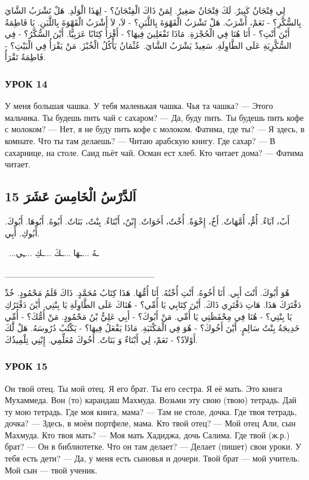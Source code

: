 \documentclass[a5paper]{article}
\begin{document}
لِي فِنْجَانٌ كَبِيرٌ. لَكَ فِنْجَانٌ صَغِيرٌ. لِمَنْ ذَاكَ الْفِنْجَانُ؟ - لِهَذَا الْوَلَدِ. هَلْ تَشْرَبُ الشَّايَ بِالسُّكَّرِ؟ - نَعَمْ، أَشْرَبُ. هَلْ تَشْرَبُ الْقَهْوَةَ بِاللَّبَنِ؟ - لاَ، لاَ أَشْرَبُ الْقَهْوَةَ بِاللَّبَنِ. يَا فَاطِمَةُ أَيْنَ أَنْتِ؟ - أَنَا هُنَا فِي الْحُجْرَةِ. مَاذَا تَفْعَلِينَ فِيهَا؟ - أَقْرَأُ كِتَابًا عَرَبِيًّا. أَيْنَ السُّكَّرُ؟ - فِي السُّكَّرِيَةِ عَلَى الطَّاوِلَةِ. سَعِيدٌ يَشْرَبُ الشَّايَ. عُثْمَانُ يَأْكُلُ الْخُبْزَ. مَنْ يَقْرَأُ فِي الْبَيْتِ؟ - فَاطِمَةُ تَقْرَأُ.

\subsubsection{УРОК 14}
У меня большая чашка. У тебя маленькая чашка. Чья та чашка? — Этого мальчика. Ты будешь пить чай с сахаром? — Да, буду пить. Ты будешь пить кофе с молоком? — Нет, я не буду пить кофе с молоком. Фатима, где ты? — Я здесь, в комнате. Что ты там дела­ешь? — Читаю арабскую книгу. Где сахар? — В сахарнице, на столе. Саид пьёт чай. Осман ест хлеб. Кто читает дома? — Фатима читает.

\subsection{15 اَلدَّرْسُ الْخَامِسَ عَشَرَ}
أَبٌ، آبَاءٌ. أُمٌّ، أُمَّهَاتٌ. أَخٌ، إِخْوَةٌ. أُخْتٌ، أَخَوَاتٌ. إِبْنٌ، أَبْنَاءٌ. بِنْتٌ، بَنَاتٌ. أَبُوهُ. أَبُوهَا. أَبُوكَ. أَبُوكِ. أَبِي.

\ ...ـهُ ...ـهَا ...ـكَ ...ـكِ ...ـِي

\_\_\_\_\_\_\_\_\_\_\_\_\_\_\_\_\_\_\_\_\_\_\_\_

هُوَ أَبُوكَ. أَنْتَ أَبِي. أَنَا أَخُوهُ. أَنْتِ أُخْتُهُ. أَنَا أُمُّهَا. هَذَا كِتَابُ مُحَمَّدٍ. ذَاكَ قَلَمُ مَحْمُودٍ. خُذْ دَفْتَرَكَ هَذَا. هَاتِ دَفْتَرِي ذَاكَ. أَيْنَ كِتَابِي يَا أُمِّي؟ - هُنَاكَ عَلَى الطَّاوِلَةِ يَا بِنْتِي. أَيْنَ دَفْتَرُكِ يَا بِنْتِي؟ - هُنَا فِي مِحْفَظَتِي يَا أُمِّي. مَنْ أَبُوكَ؟ - أَبِي عَلِيُّ بْنُ مَحْمُودٍ. مَنْ أُمُّكَ؟ - أُمِّي خَدِيجَةُ بِنْتُ سَالِمٍ. أَيْنَ أَخُوكَ؟ - هُوَ فِي الْمَكْتَبَةِ. مَاذَا يَفْعَلُ فِيهَا؟ - يَكْتُبُ دُرُوسَهُ. هَلْ لَّكَ أَوْلاَدٌ؟ - نَعَمْ، لِي أَبْنَاءٌ وَ بَنَاتٌ. أَخُوكَ مُعَلِّمِي. إِبْنِي تِلْمِيذُكَ.

\subsubsection{УРОК 15}
Он твой отец. Ты мой отец. Я его брат. Ты его сестра. Я её мать. Это книга Мухаммеда. Вон (то) карандаш Махмуда. Возьми эту свою (твою) тетрадь. Дай ту мою тетрадь. Где моя книга, мама? — Там не столе, дочка. Где твоя тетрадь, дочка? — Здесь, в моём портфеле, мама. Кто твой отец? — Мой отец Али, сын Махмуда. Кто твоя мать? — Моя мать Хадиджа, дочь Салима. Где твой (ж.р.) брат? — Он в библиотетке. Что он там делает? — Делает (пишет) свои уроки. У тебя есть дети? — Да, у меня есть сыновья и дочери. Твой брат — мой учитель. Мой сын — твой ученик.
\end{document}
